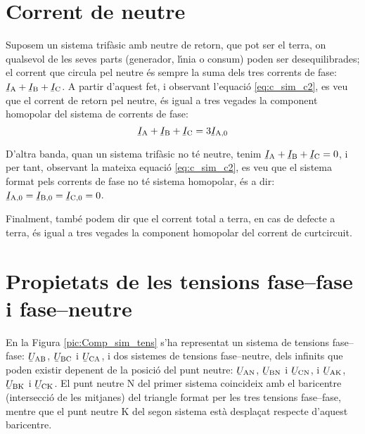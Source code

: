 \section{Corrent de neutre} 

Suposem un sistema trif\`{a}sic amb neutre de retorn, que pot ser el
terra, on qualsevol de les seves parts (generador, l\'{\i}nia o consum)
poden ser desequilibrades; el corrent que circula pel neutre \'{e}s
sempre la suma dels tres corrents de fase: $\cmplx{I}\ped{A}+
\cmplx{I}\ped{B}+\cmplx{I}\ped{C}$. A partir d'aquest fet, i
observant l'equaci\'{o} \eqref{eq:c_sim_c2}, es veu que el corrent de
retorn pel neutre, \'{e}s igual a tres vegades la component homopolar
del sistema de corrents de fase:
\begin{equation}
    \cmplx{I}\ped{A}+\cmplx{I}\ped{B}+\cmplx{I}\ped{C} =3 \cmplx{I}\ped{A,0}
\end{equation}

D'altra banda, quan un sistema trif\`{a}sic no t\'{e} neutre, tenim
$\cmplx{I}\ped{A}+ \cmplx{I}\ped{B}+\cmplx{I}\ped{C}=0$, i per tant,
observant la mateixa equaci\'{o} \eqref{eq:c_sim_c2}, es veu que el
sistema format pels corrents de fase no t\'{e} sistema homopolar, \'{e}s a dir: $\cmplx{I}\ped{A,0}=\cmplx{I}\ped{B,0}=\cmplx{I}\ped{C,0}=0$.

Finalment, tamb\'{e} podem dir que el corrent total a terra, en cas de
defecte a terra, \'{e}s igual a tres vegades la component homopolar del
corrent de curtcircuit.

\section{Propietats de les tensions fase--fase i fase--neutre}\label{sec:comp-sim-neutre}
 

En la Figura \vref{pic:Comp_sim_tens} s'ha representat un sistema de
tensions fase--fase: $\cmplx{U}\ped{AB}$,
$\cmplx{U}\ped{BC}$ i $\cmplx{U}\ped{CA}$, i dos
sistemes de tensions fase--neutre, dels infinits que poden existir
depenent de la posici\'{o} del punt neutre: $\cmplx{U}\ped{AN}$,
$\cmplx{U}\ped{BN}$ i $\cmplx{U}\ped{CN}$, i
$\cmplx{U}\ped{AK}$, $\cmplx{U}\ped{BK}$ i
$\cmplx{U}\ped{CK}$. El punt neutre N del primer sistema
coincideix amb el baricentre (intersecci\'{o} de les mitjanes) del
triangle  format per les tres tensions fase--fase, mentre que el
punt neutre K del segon sistema est\`{a} despla\c{c}at respecte
d'aquest baricentre.

